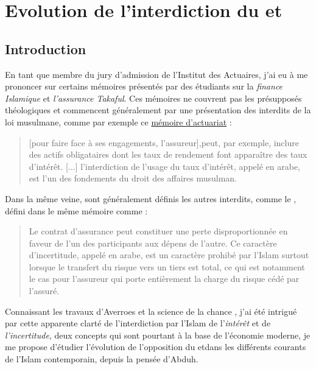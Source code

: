 \chapter{Evolution de l'interdiction du \riba et \gharar}


\section{Introduction}

En tant que membre du jury d'admission de l'Institut des Actuaires, j'ai eu à me prononcer sur certains mémoires présentés par des étudiants sur la \textit{finance Islamique} et \textit{l'assurance Takaful}. Ces mémoires ne couvrent pas les présupposés théologiques et commencent généralement par une présentation des interdits de la loi musulmane, comme par exemple ce \href{http://www.ressources-actuarielles.net/EXT/ISFA/1226-02.nsf/0/8c814ff5f2bae57ec1257e1a004407b6/\%24FILE/Memoire_ISFA_Tontines_et_Takaful_Bendimerad_Version_avec_Couverture.pdf}{mémoire d'actuariat} : 
\begin{quote}
     [pour faire face à ses  engagements, l'assureur],peut, par exemple, inclure des actifs obligataires dont les taux de rendement font apparaître des taux d'intérêt. [...] l'interdiction de l'usage du taux d'intérêt, appelé \textit{\riba} en arabe, est l'un des fondements du droit des affaires musulman. 
\end{quote}
Dans la même veine, sont généralement définis les autres interdits, comme le \gharar, défini dans le même mémoire comme : 
\begin{quote}
    Le contrat d'assurance peut constituer une perte disproportionnée en faveur de l'un des participants aux dépens de l'autre. Ce caractère d'incertitude, appelé \gharar en arabe, est un caractère prohibé par l'Islam surtout lorsque le transfert du risque vers un tiers est total, ce qui est notamment le cas pour l'assureur qui porte entièrement la charge du risque cédé par l'assuré. 
\end{quote}


Connaissant les travaux d'Averroes et la science de la chance , j'ai été intrigué par cette apparente clarté de l'interdiction par l'Islam de l'\textit{intérêt} et de \textit{l'incertitude}, deux concepts qui sont pourtant à la base de l'économie moderne, je me propose d'étudier l'évolution de l'opposition du {\riba} et\gharar dans les différents courants de l'Islam contemporain, depuis la pensée d'Abduh. 

